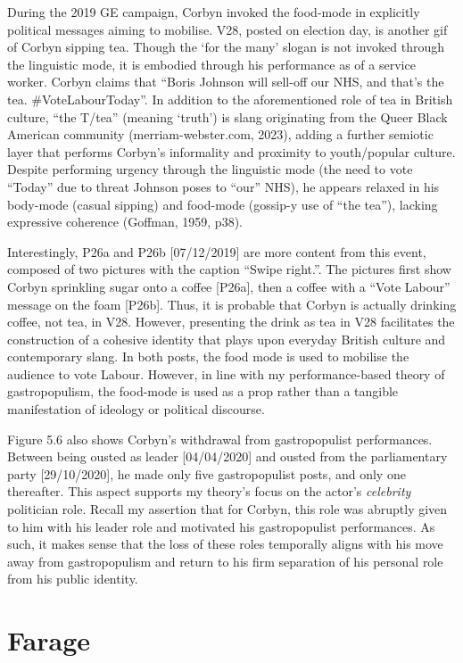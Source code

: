 \documentclass[a4paper, nobind]{templates/ociamthesis}
\begin{document}
During the 2019 GE campaign, Corbyn invoked the food-mode in explicitly political messages aiming to mobilise. V28, posted on election day, is another gif of Corbyn sipping tea. Though the `for the many' slogan is not invoked through the linguistic mode, it is embodied through his performance as of a service worker. Corbyn claims that ``Boris Johnson will sell-off our NHS, and that's the tea. \#VoteLabourToday''. In addition to the aforementioned role of tea in British culture, ``the T/tea'' (meaning `truth') is slang originating from the Queer Black American community (merriam-webster.com, 2023), adding a further semiotic layer that performs Corbyn's informality and proximity to youth/popular culture. Despite performing urgency through the linguistic mode (the need to vote ``Today'' due to threat Johnson poses to ``our'' NHS), he appears relaxed in his body-mode (casual sipping) and food-mode (gossip-y use of ``the tea''), lacking expressive coherence (Goffman, 1959, p38).

Interestingly, P26a and P26b {[}07/12/2019{]} are more content from this event, composed of two pictures with the caption ``Swipe right.''. The pictures first show Corbyn sprinkling sugar onto a coffee {[}P26a{]}, then a coffee with a ``Vote Labour'' message on the foam {[}P26b{]}. Thus, it is probable that Corbyn is actually drinking coffee, not tea, in V28. However, presenting the drink as tea in V28 facilitates the construction of a cohesive identity that plays upon everyday British culture and contemporary slang. In both posts, the food mode is used to mobilise the audience to vote Labour. However, in line with my performance-based theory of gastropopulism, the food-mode is used as a prop rather than a tangible manifestation of ideology or political discourse.

Figure 5.6 also shows Corbyn's withdrawal from gastropopulist performances. Between being ousted as leader {[}04/04/2020{]} and ousted from the parliamentary party {[}29/10/2020{]}, he made only five gastropopulist posts, and only one thereafter. This aspect supports my theory's focus on the actor's \emph{celebrity} politician role. Recall my assertion that for Corbyn, this role was abruptly given to him with his leader role and motivated his gastropopulist performances. As such, it makes sense that the loss of these roles temporally aligns with his move away from gastropopulism and return to his firm separation of his personal role from his public identity.

\hypertarget{farage}{%
\section{Farage}\label{farage}}
\end{document}
